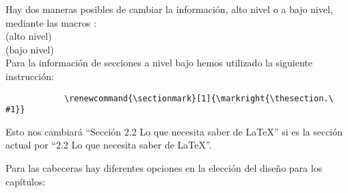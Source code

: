 		Hay dos maneras posibles de cambiar la información,  alto nivel o a bajo nivel, mediante las macros :\\

		\noindent{} (alto nivel)\\
		 (bajo nivel)\\
		
		Para la información de secciones a nivel bajo hemos utilizado la siguiente instrucción:

		\begin{verbatim}
			\renewcommand{\sectionmark}[1]{\markright{\thesection.\ #1}}
		\end{verbatim}

		Esto nos cambiará ``Sección 2.2 Lo que necesita saber de \LaTeX'' si es la sección actual por ``2.2 Lo que necesita saber de \LaTeX''.

		Para las cabeceras hay diferentes opciones en la elección del diseño para los capítulos:
		
